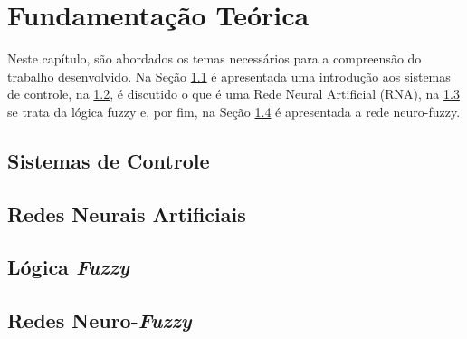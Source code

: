 %
%

\chapter{Fundamentação Teórica}
\label{chap:fundamentacaoTeorica}

Neste capítulo, são abordados os temas necessários para a compreensão do trabalho desenvolvido. Na Seção \ref{sec:fundamentacaoTeorica-sistemas-controle} é apresentada uma introdução aos sistemas de controle, na \ref{sec:fundamentacaoTeorica-rna}, é discutido o que é uma Rede Neural Artificial (RNA), na \ref{sec:fundamentacaoTeorica-fuzzy} se trata da lógica fuzzy e, por fim, na Seção \ref{sec:fundamentacaoTeorica-neuro-fuzzy} é apresentada a rede neuro-fuzzy.

\section{Sistemas de Controle}
\label{sec:fundamentacaoTeorica-sistemas-controle}



\section{Redes Neurais Artificiais}
\label{sec:fundamentacaoTeorica-rna}



\section{Lógica \textit{Fuzzy}}
\label{sec:fundamentacaoTeorica-fuzzy}



\section{Redes Neuro-\textit{Fuzzy}}
\label{sec:fundamentacaoTeorica-neuro-fuzzy}
%



